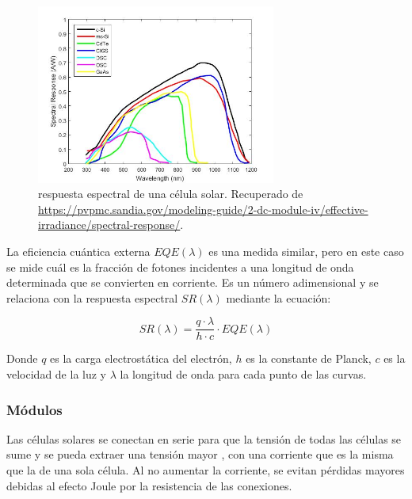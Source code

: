 \begin{figure}[H]
      \centering
      \includegraphics[width=0.7\textwidth]{./images/SoA_irrad/Spectral_Response_PV.jpg}
      \caption{\Gls{respuesta espectral} de una \gls{célula solar}. Recuperado de \url{https://pvpmc.sandia.gov/modeling-guide/2-dc-module-iv/effective-irradiance/spectral-response/}.}
      \label{fig:spectral_response}
\end{figure}

La \gls{eficiencia cuántica externa} $EQE(\lambda)$ es una medida similar, pero en este caso se mide cuál es la fracción de fotones incidentes a una \gls{longitud de onda} determinada que se convierten en corriente. Es un número adimensional y se relaciona con la \gls{respuesta espectral} $SR(\lambda)$ mediante la ecuación:

\begin{equation} \label{eq:relacion_sr_eqe}
      SR(\lambda) = \frac{q \cdot \lambda}{h \cdot c} \cdot EQE(\lambda)
\end{equation}

Donde $q$ es la carga electrostática del electrón, $h$ es la constante de Planck, $c$ es la velocidad de la luz y $\lambda$ la \gls{longitud de onda} para cada punto de las curvas.

\subsubsection{Módulos}

Las células solares se conectan en serie para que la tensión de todas las células se sume y se pueda extraer una tensión mayor \cite{victoria2024fundamentals}, con una corriente que es la misma que la de una sola célula. Al no aumentar la corriente, se evitan pérdidas mayores debidas al \gls{efecto Joule} por la resistencia de las conexiones.

